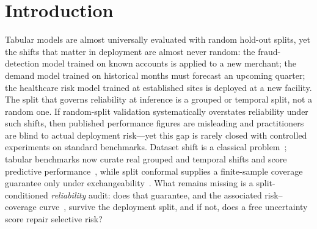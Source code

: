 \documentclass[pdflatex,sn-mathphys-num]{sn-jnl}
\begin{document}
\maketitle
\section{Introduction}\label{sec:intro}
Tabular models are almost universally evaluated with random hold-out splits, yet the shifts that matter in
deployment are almost never random: the fraud-detection model trained on known accounts is applied to a new
merchant; the demand model trained on historical months must forecast an upcoming quarter; the healthcare risk
model trained at established sites is deployed at a new facility.
The split that governs reliability at inference is a grouped or temporal split, not a random one.
If random-split validation systematically overstates reliability under such shifts, then published performance
figures are misleading and practitioners are blind to actual deployment risk---yet this gap is
rarely closed with controlled experiments on standard benchmarks.
Dataset shift is a classical problem~\citep{quinonerocandela2009datasetshift}; tabular benchmarks now
curate real grouped and temporal shifts and score predictive performance~\citep{gardner2023tableshift,whyshift2023,wildtab2023},
while split conformal supplies a finite-sample coverage guarantee only under exchangeability~\citep{vovk2005algorithmic,angelopoulos2023conformal}.
What remains missing is a split-conditioned \emph{reliability} audit: does that guarantee, and the associated
risk--coverage curve~\citep{elyaniv2010selective,geifman2017selective}, survive the deployment split, and if not,
does a free uncertainty score repair selective risk?
\end{document}
